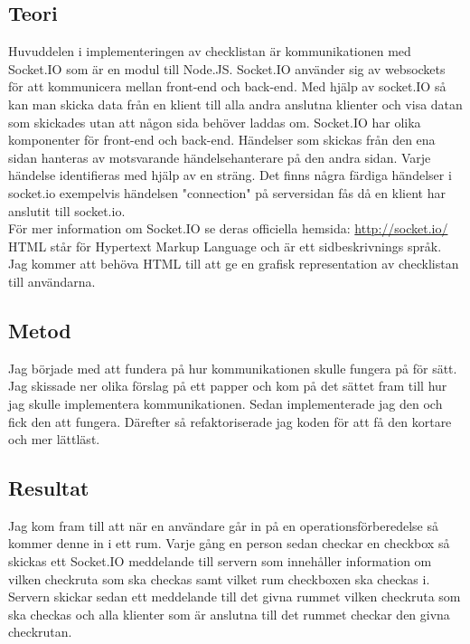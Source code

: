 \subsection{Teori}
Huvuddelen i implementeringen av checklistan är kommunikationen med Socket.IO som är en modul till Node.JS. Socket.IO använder sig av websockets för att kommunicera mellan front-end och back-end. Med hjälp av socket.IO så kan man skicka data från en klient till alla andra anslutna klienter och visa datan som skickades utan att någon sida behöver laddas om.
Socket.IO har olika komponenter för front-end och back-end. Händelser som skickas från den ena sidan hanteras av motsvarande händelsehanterare på den andra sidan. Varje händelse identifieras med hjälp av en sträng. Det finns några färdiga händelser i socket.io exempelvis händelsen "connection" på serversidan fås då en klient har anslutit till socket.io. \cite{socketBook} \\

För mer information om Socket.IO se deras officiella hemsida: \url{http://socket.io/}\\

HTML står för Hypertext Markup Language och är ett sidbeskrivnings språk. \cite{html} Jag kommer att behöva HTML till att ge en grafisk representation av checklistan till användarna.\\

 
\subsection{Metod}
Jag började med att fundera på hur kommunikationen skulle fungera på för sätt. Jag skissade ner olika förslag på ett papper och kom på det sättet fram till hur jag skulle implementera kommunikationen. Sedan implementerade jag den och fick den att fungera. Därefter så refaktoriserade jag koden för att få den kortare och mer lättläst.

\subsection{Resultat}
Jag kom fram till att när en användare går in på en operationsförberedelse så kommer denne in i ett rum. Varje gång en person sedan checkar en checkbox så skickas ett Socket.IO meddelande till servern som innehåller information om vilken checkruta som ska checkas samt vilket rum checkboxen ska checkas i. Servern skickar sedan ett meddelande till det givna rummet vilken checkruta som ska checkas och alla klienter som är anslutna till det rummet checkar den givna checkrutan. \\


